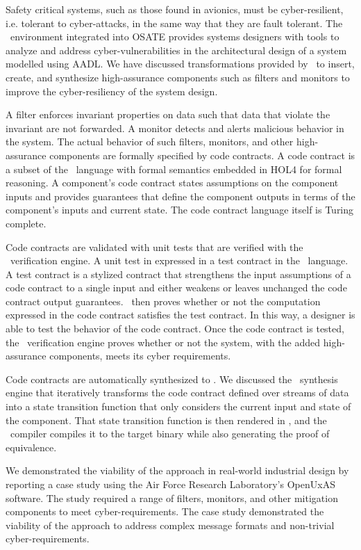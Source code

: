 Safety critical systems, such as those found in avionics, must be cyber-resilient, i.e. tolerant to cyber-attacks, in the same way that they are fault tolerant. 
The \brfcs\ environment integrated into OSATE provides systems designers with tools to analyze and address cyber-vulnerabilities in the architectural design of a system modelled using AADL.
We have discussed transformations provided by \brfcs\ to insert, create, and synthesize high-assurance components such as filters and monitors to improve the cyber-resiliency of the system design.

A filter enforces invariant properties on data such that data that violate the invariant are not forwarded.
A monitor detects and alerts malicious behavior in the system. 
The actual behavior of such filters, monitors, and other high-assurance components are formally specified by code contracts.
A code contract is a subset of the \agr\ language with formal semantics embedded in HOL4 for formal reasoning.
A component's code contract states assumptions on the component inputs and provides guarantees that define the component outputs in terms of the component's inputs and current state.
The code contract language itself is Turing complete.

Code contracts are validated with unit tests that are verified with the \agr\ verification engine.
A unit test in expressed in a test contract in the \agr\ language.
A test contract is a stylized contract that strengthens the input assumptions of a code contract to a single input and either weakens or leaves unchanged the code contract output guarantees.
\agr\ then proves whether or not the computation expressed in the code contract satisfies the test contract.
In this way, a designer is able to test the behavior of the code contract.
Once the code contract is tested, the \agr\ verification engine proves whether or not the system, with the added high-assurance components, meets its cyber requirements.

Code contracts are automatically synthesized to \ckml.
We discussed the \splt\ synthesis engine that iteratively transforms the code contract defined over streams of data into a state transition function that only considers the current input and state of the component.
That state transition function is then rendered in \ckml, and the \ckml\ compiler compiles it to the target binary while also generating the proof of equivalence.

We demonstrated the viability of the approach in real-world industrial design by reporting a case study using the Air Force Research Laboratory's OpenUxAS software.
The study required a range of filters, monitors, and other mitigation components to meet cyber-requirements.
The case study demonstrated the viability of the approach to address complex message formats and non-trivial cyber-requirements.

